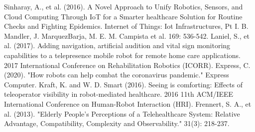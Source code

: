 \documentclass[a4paper]{article}
\begin{document}
\begin{thebibliography}{99}
    Sinharay, A., et al. (2016). A Novel Approach to Unify Robotics, Sensors, and Cloud Computing Through IoT for a Smarter healthcare Solution for Routine Checks and Fighting Epidemics. Internet of Things: Iot Infrastructures, Pt I. B. Mandler, J. MarquezBarja, M. E. M. Campista et al. 169: 536-542.
    Laniel, S., et al. (2017). Adding navigation, artificial audition and vital sign monitoring capabilities to a telepresence mobile robot for remote home care applications. 2017 International Conference on Rehabilitation Robotics (ICORR).
    Express, C. (2020). "How robots can help combat the coronavirus pandemic." Express Computer.
    Kraft, K. and W. D. Smart (2016). Seeing is comforting: Effects of teleoperator visibility in robot-mediated healthcare. 2016 11th ACM/IEEE International Conference on Human-Robot Interaction (HRI).
    Frennert, S. A., et al. (2013). "Elderly People's Perceptions of a Telehealthcare System: Relative Advantage, Compatibility, Complexity and Observability."  31(3): 218-237.
    

\end{thebibliography}
\end{document}
